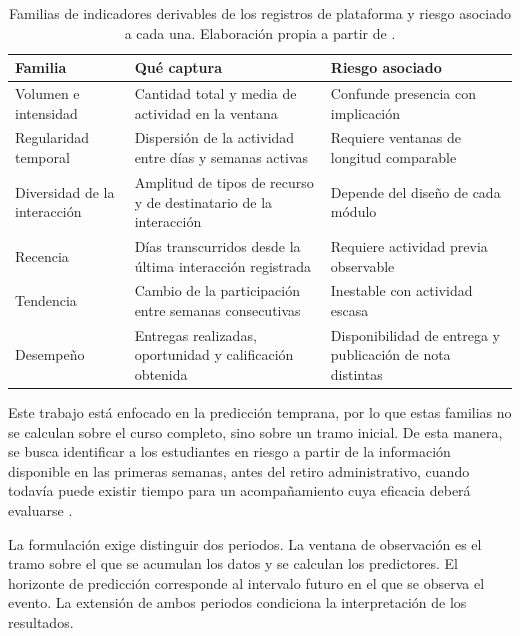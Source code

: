 \begin{table}[htbp]
\centering
\caption[Familias de indicadores derivables de los registros de plataforma y riesgo asociado a cada una.]{Familias de indicadores derivables de los registros de plataforma y riesgo asociado a cada una. Elaboración propia a partir de \cite{macfadyendawson2010,agudoperegrina2014,wolff2013,halawa2014}.}
\label{tab:familias-clickstream}
\small
\begin{tabular}{p{} p{} p{}}
\hline
\textbf{Familia} & \textbf{Qué captura} & \textbf{Riesgo asociado} \\
\hline
Volumen e intensidad & Cantidad total y media de actividad en la ventana & Confunde presencia con implicación \\
Regularidad temporal & Dispersión de la actividad entre días y semanas activas & Requiere ventanas de longitud comparable \\
Diversidad de la interacción & Amplitud de tipos de recurso y de destinatario de la interacción & Depende del diseño de cada módulo \\
Recencia & Días transcurridos desde la última interacción registrada & Requiere actividad previa observable \\
Tendencia & Cambio de la participación entre semanas consecutivas & Inestable con actividad escasa \\
Desempeño & Entregas realizadas, oportunidad y calificación obtenida & Disponibilidad de entrega y publicación de nota distintas \\
\hline
\end{tabular}
\end{table}

 Este trabajo está enfocado en la predicción temprana, por lo que estas familias no se calculan sobre el curso completo, sino sobre un tramo inicial. De esta manera, se busca identificar a los estudiantes en riesgo a partir de la información disponible en las primeras semanas, antes del retiro administrativo, cuando todavía puede existir tiempo para un acompañamiento cuya eficacia deberá evaluarse \cite{bdcc9110297,gardnerbrooks2018}. 

La formulación exige distinguir dos periodos. La ventana de observación es el tramo sobre el que se acumulan los datos y se calculan los predictores. El horizonte de predicción corresponde al intervalo futuro en el que se observa el evento. La extensión de ambos periodos condiciona la interpretación de los resultados. 
 

